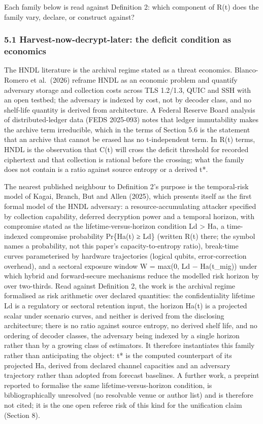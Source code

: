 \documentclass[
]{llncs}
\begin{document}
Each family below is read against Definition 2: which component of R(t)
does the family vary, declare, or construct against?

\subsubsection{5.1 Harvest-now-decrypt-later: the deficit condition as
economics}\label{harvest-now-decrypt-later-the-deficit-condition-as-economics}

The HNDL literature is the archival regime stated as a threat economics.
Blanco-Romero et al.~(2026) reframe HNDL as an economic problem and
quantify adversary storage and collection costs across TLS 1.2/1.3, QUIC
and SSH with an open testbed; the adversary is indexed by cost, not by
decoder class, and no shelf-life quantity is derived from architecture.
A Federal Reserve Board analysis of distributed-ledger data (FEDS
2025-093) notes that ledger immutability makes the archive term
irreducible, which in the terms of Section 5.6 is the statement that an
archive that cannot be erased has no t-independent term. In R(t) terms,
HNDL is the observation that C(t) will cross the deficit threshold for
recorded ciphertext and that collection is rational before the crossing;
what the family does not contain is a ratio against source entropy or a
derived t*.

The nearest published neighbour to Definition 2's purpose is the
temporal-risk model of Kagai, Branch, But and Allen (2025), which
presents itself as the first formal model of the HNDL adversary: a
resource-accumulating attacker specified by collection capability,
deferred decryption power and a temporal horizon, with compromise stated
as the lifetime-versus-horizon condition Ld \textgreater{} Ha, a
time-indexed compromise probability Pr\{Ha(t) ≥ Ld\} (written R(t)
there; the symbol names a probability, not this paper's
capacity-to-entropy ratio), break-time curves parameterised by hardware
trajectories (logical qubits, error-correction overhead), and a sectoral
exposure window W = max(0, Ld − Ha(t\_mig)) under which hybrid and
forward-secure mechanisms reduce the modelled risk horizon by over
two-thirds. Read against Definition 2, the work is the archival regime
formalised as risk arithmetic over declared quantities: the
confidentiality lifetime Ld is a regulatory or sectoral retention input,
the horizon Ha(t) is a projected scalar under scenario curves, and
neither is derived from the disclosing architecture; there is no ratio
against source entropy, no derived shelf life, and no ordering of
decoder classes, the adversary being indexed by a single horizon rather
than by a growing class of estimators. It therefore instantiates this
family rather than anticipating the object: t* is the computed
counterpart of its projected Ha, derived from declared channel
capacities and an adversary trajectory rather than adopted from forecast
baselines. A further work, a preprint reported to formalise the same
lifetime-versus-horizon condition, is bibliographically unresolved (no
resolvable venue or author list) and is therefore not cited; it is the
one open referee risk of this kind for the unification claim (Section
8).
\end{document}

